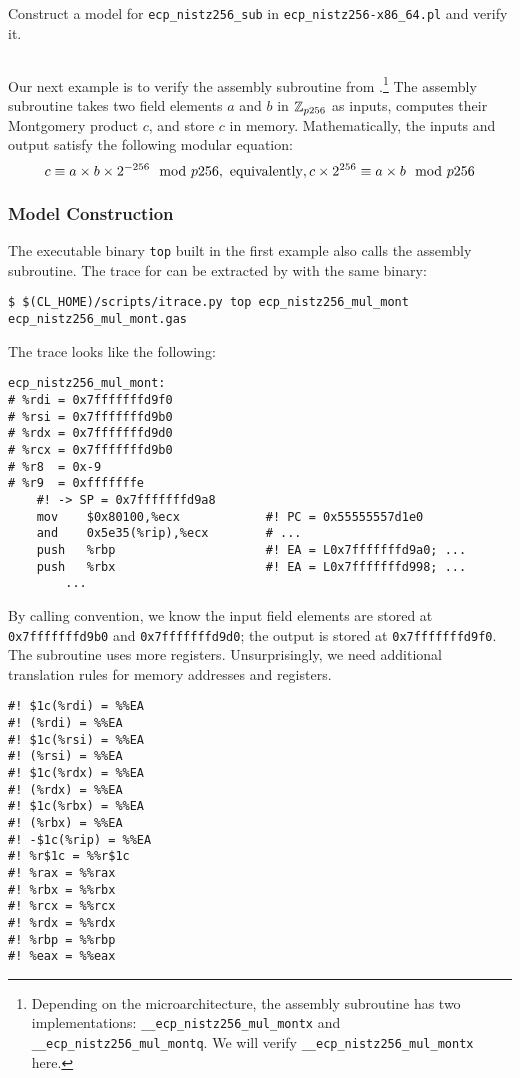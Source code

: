 \documentclass{amsproc}
\begin{document}
\exercise Construct a model for \texttt{ecp\_nistz256\_sub} in 
\texttt{ecp\_nistz256-x86\_64.pl} and verify it.

\subsection{\nistzmul}

Our next example is to verify the assembly subroutine \nistzmul from
\openssl.\footnote{Depending on the 
\xeightysix microarchitecture, the assembly subroutine \nistzmul
has two implementations: \texttt{\_\_ecp\_nistz256\_mul\_montx} and
\texttt{\_\_ecp\_nistz256\_mul\_montq}. We will verify
\texttt{\_\_ecp\_nistz256\_mul\_montx} here.} The assembly subroutine
takes two field elements $a$ and $b$ in $\mathbb{Z}_{p256}$ as inputs,
computes their Montgomery product $c$, and store $c$ in
memory. Mathematically, the inputs and output satisfy the following
modular equation:
\[
c \equiv a \times b \times 2^{-256} \mod p256, \textmd{
  equivalently}, 
c \times 2^{256} \equiv a \times b \mod p256
\]

\subsubsection{Model Construction}

The executable binary
\texttt{top} built in the first example also calls the assembly
subroutine. The trace for \nistzmul can be extracted by \itrace with
the same binary:
\begin{verbatim}
$ $(CL_HOME)/scripts/itrace.py top ecp_nistz256_mul_mont ecp_nistz256_mul_mont.gas
\end{verbatim}

The trace \nistzmulgas looks like the following:
\begin{verbatim}
ecp_nistz256_mul_mont:
# %rdi = 0x7fffffffd9f0
# %rsi = 0x7fffffffd9b0
# %rdx = 0x7fffffffd9d0
# %rcx = 0x7fffffffd9b0
# %r8  = 0x-9
# %r9  = 0xfffffffe
	#! -> SP = 0x7fffffffd9a8
	mov    $0x80100,%ecx            #! PC = 0x55555557d1e0
	and    0x5e35(%rip),%ecx        # ...
	push   %rbp                     #! EA = L0x7fffffffd9a0; ...
	push   %rbx                     #! EA = L0x7fffffffd998; ...
        ...
\end{verbatim}
By calling convention, we know the input field elements are stored at
\texttt{0x7fffffffd9b0} and \texttt{0x7fffffffd9d0}; the output is
stored at \texttt{0x7fffffffd9f0}. The subroutine uses more
registers. Unsurprisingly, we need additional translation rules for
memory addresses and registers.
\begin{verbatim}
#! $1c(%rdi) = %%EA
#! (%rdi) = %%EA
#! $1c(%rsi) = %%EA
#! (%rsi) = %%EA
#! $1c(%rdx) = %%EA
#! (%rdx) = %%EA
#! $1c(%rbx) = %%EA
#! (%rbx) = %%EA
#! -$1c(%rip) = %%EA
#! %r$1c = %%r$1c
#! %rax = %%rax
#! %rbx = %%rbx
#! %rcx = %%rcx
#! %rdx = %%rdx
#! %rbp = %%rbp
#! %eax = %%eax
\end{verbatim}
\end{document}
